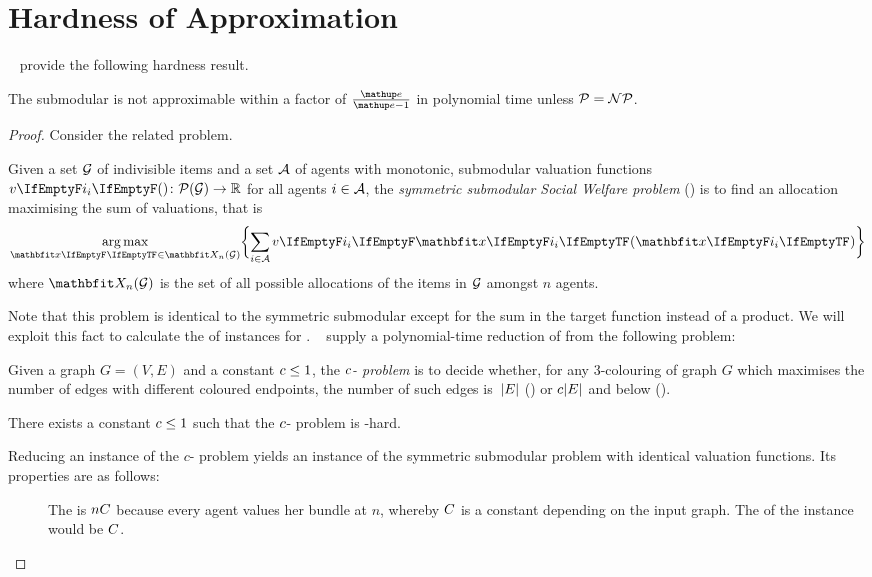 \section{Hardness of Approximation}
\label{sec:hardness}

~\cite[Sction 4]{APNSWuSVþUM} provide the following hardness result.
\begin{theorem}
	The submodular \NSW{} is not approximable within a factor of \(\frac{\euler}{\euler - 1}\) in polynomial time unless \(\mathcal{P} = \mathcal{NP}\).
\end{theorem}
\begin{proof}
	Consider the related \SW{} problem\footnotemark.
	\begin{problem}
		Given a set \(\mathcal{G}\) of indivisible items and a set \(\mathcal{A}\) of agents with monotonic, submodular valuation functions \(\valuations \colon \powerset[\goods] \to \real\) for all agents \(i \in \mathcal{A}\), the \emph{symmetric submodular Social Welfare problem} (\SW) is to find an allocation maximising the sum of valuations, that is
		\begin{equation*}
			\argmax_{\alloc[][] \in \allallocs{n}{\goods}} \braces[\bigg]{ \smashoperator{\sum_{i \in \agents}} \valuations[\alloc] }
		\end{equation*}
		where \(\allallocs{n}{\goods}\) is the set of all possible allocations of the items in \(\mathcal{G}\) amongst \(n\) agents.
	\end{problem}

	Note that this problem is identical to the symmetric submodular \NSW{} except for the sum in the target function instead of a product.
	We will exploit this fact to calculate the \NSW{} of instances for \SW.
	\citeauthor{inapproximability}~\cite{inapproximability} supply a polynomial-time reduction of \SW{} from the following problem:
	\begin{problem}
		Given a graph \(G = (V, E)\) and a constant \(c \le 1\), the \emph{\(c\)-\Gap{} problem} is to decide whether, for any 3-colouring of graph \(G\) which maximises the number of edges with different coloured endpoints, the number of such edges is~\(\vert E\vert\) (\emph{\Yes}) or \(c \vert E\vert\) and below (\emph{\No}).
	\end{problem}

	\begin{proposition}
		There exists a constant \(c \le 1\) such that the \(c\)-\Gap{} problem is \NP-hard.
	\end{proposition}
	Reducing an instance of the \(c\)-\Gap{} problem yields an instance of the symmetric submodular \SW{} problem with identical valuation functions.
	Its properties are as follows:
	\begin{description}
		\item[\Yes]
		The \SW{} is \(n C\) because every agent values her bundle at \(n\), whereby \(C\) is a constant depending on the input graph.
		The \NSW{} of the instance would be \(C\).


\end{description}
\end{proof}

